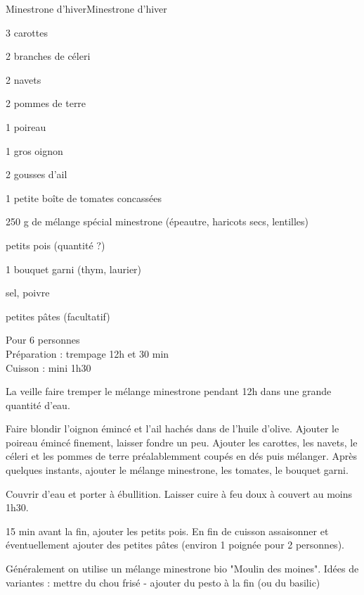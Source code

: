 \begin{recette}{Minestrone d'hiver}{Minestrone d'hiver}

\begin{ingredients}
3 carottes\par
2 branches de céleri\par
2 navets\par
2 pommes de terre\par
1 poireau\par
1 gros oignon\par
2 gousses d'ail\par
1 petite boîte de tomates concassées\par
250 g de mélange spécial minestrone (épeautre, haricots secs, lentilles)\par
petits pois (quantité ?)\par
1 bouquet garni (thym, laurier)\par
sel, poivre\par
petites pâtes (facultatif)\par
\end{ingredients}

\begin{infos}
Pour 6 personnes\\
Préparation : trempage 12h et 30 min\\
Cuisson : mini 1h30\\
\end{infos}

\begin{etapes}
\item La veille faire tremper le mélange minestrone pendant 12h dans une grande quantité d'eau.
\item Faire blondir l'oignon émincé et l'ail hachés dans de l'huile d'olive. Ajouter le poireau émincé finement, laisser fondre un peu. Ajouter les carottes, les navets, le céleri et les pommes de terre préalablemment coupés en dés puis mélanger. Après quelques instants, ajouter le mélange minestrone, les tomates, le bouquet garni.
\item Couvrir d'eau et porter à ébullition. Laisser cuire à feu doux à couvert au moins 1h30.
\item 15 min avant la fin, ajouter les petits pois. En fin de cuisson assaisonner et éventuellement ajouter des petites pâtes (environ 1 poignée pour 2 personnes).
\end{etapes}

\begin{conseils}
Généralement on utilise un mélange minestrone bio "Moulin des moines".
Idées de variantes : mettre du chou frisé - ajouter du pesto à la fin (ou du basilic)
\end{conseils}

\end{recette}